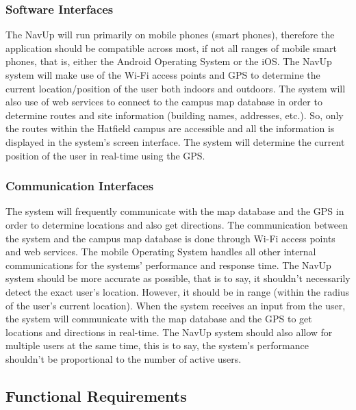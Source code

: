 \documentclass{article}
\begin{document}
	\subsubsection{Software Interfaces}
The NavUp will run primarily on mobile phones (smart phones), therefore the application should be compatible across most, 
if not all ranges of mobile smart phones, that is, either the Android Operating System or the iOS. The NavUp system will make 
use of the Wi-Fi access points and GPS to determine the current location/position of the user both indoors and outdoors. The 
system will also use of web services to connect to the campus map database in order to determine routes and site information (building names, addresses, etc.). 
So, only the routes within the Hatfield campus are accessible and all the information is displayed in the system’s screen interface. 
The system will determine the current position of the user in real-time using the GPS. \\

	\subsubsection{Communication Interfaces}
{The system will frequently communicate with the map database and the GPS in order to determine 
locations and also get directions. The communication between the system and the campus map database is done through Wi-Fi access points and web services. 
The mobile Operating System handles all other internal communications for the systems’ performance and response time. 
The NavUp system should be more accurate as possible, that is to say, it shouldn’t necessarily detect the exact user’s location. 
However, it should be in range (within the radius of the user’s current location). When the system receives an input from the user, 
the system will communicate with the map database and the GPS to get locations and directions in real-time. The NavUp system should also allow 
for multiple users at the same time, this is to say, the system’s performance shouldn’t be proportional to the number of active users.} \\
	\subsection{Functional Requirements}
\end{document}
